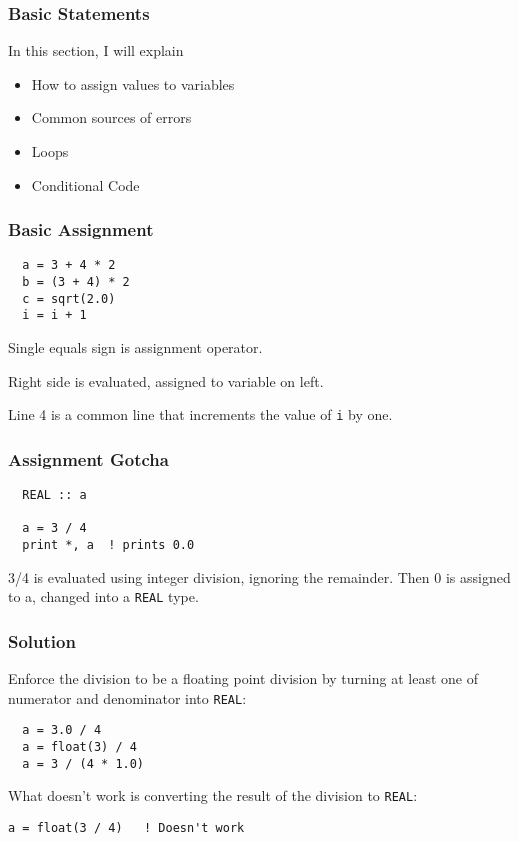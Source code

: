 \begin{frame}
  \frametitle{Basic Statements}
  In this section, I will explain
  \begin{itemize}
    \item How to assign values to variables
    \item Common sources of errors
    \item Loops
    \item Conditional Code
  \end{itemize}
\end{frame}

\begin{frame}[fragile]
  \frametitle{Basic Assignment}

  \begin{lstlisting}
  a = 3 + 4 * 2
  b = (3 + 4) * 2
  c = sqrt(2.0)
  i = i + 1
  \end{lstlisting}

  Single equals sign is assignment operator. 

  Right side is evaluated, assigned to variable on left.

  Line 4 is a common line that increments the value of \texttt{i} by one.

\end{frame}

\begin{frame}[fragile]
  \frametitle{Assignment Gotcha}

  \begin{lstlisting}
  REAL :: a

  a = 3 / 4
  print *, a  ! prints 0.0
  \end{lstlisting}

  3/4 is evaluated using integer division, ignoring the remainder.
  Then 0 is assigned to a, changed into a \texttt{REAL} type.

\end{frame}

\begin{frame}[fragile]
  \frametitle{Solution}

  Enforce the division to be a floating point division by turning
  at least one of numerator and denominator into \texttt{REAL}:

  \begin{lstlisting}
  a = 3.0 / 4
  a = float(3) / 4
  a = 3 / (4 * 1.0)
  \end{lstlisting}

  What doesn't work is converting the result of the division to \texttt{REAL}:

  \begin{lstlisting}[numbers=none]
  a = float(3 / 4)   ! Doesn't work
  \end{lstlisting}

\end{frame}

